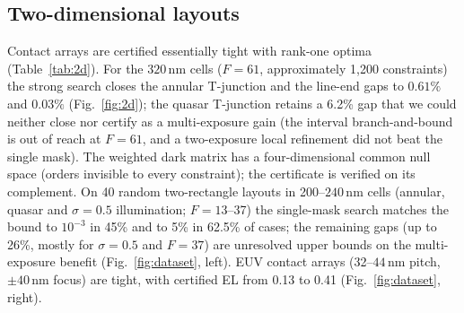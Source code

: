 \documentclass[11pt,a4paper]{article}
\newcommand{\SI}[2]{\ensuremath{#1\,\mathrm{#2}}}\newcommand{\SIrange}[3]{\ensuremath{#1\text{--}#2\,\mathrm{#3}}}
\begin{document}
\subsection{Two-dimensional layouts}
Contact arrays are certified essentially tight with rank-one optima (Table~\ref{tab:2d}). For the \SI{320}{nm} cells ($F=61$, approximately 1,200 constraints) the strong search closes the annular T-junction and the line-end gaps to $0.61\%$ and $0.03\%$ (Fig.~\ref{fig:2d}); the quasar T-junction retains a 6.2\% gap that we could neither close nor certify as a multi-exposure gain (the interval branch-and-bound is out of reach at $F=61$, and a two-exposure local refinement did not beat the single mask). The weighted dark matrix has a four-dimensional common null space (orders invisible to every constraint); the certificate is verified on its complement. On 40 random two-rectangle layouts in 200--\SI{240}{nm} cells (annular, quasar and $\sigma=0.5$ illumination; $F=13$--37) the single-mask search matches the bound to $10^{-3}$ in 45\% and to 5\% in 62.5\% of cases; the remaining gaps (up to 26\%, mostly for $\sigma=0.5$ and $F=37$) are unresolved upper bounds on the multi-exposure benefit (Fig.~\ref{fig:dataset}, left). EUV contact arrays (32--\SI{44}{nm} pitch, $\pm\SI{40}{nm}$ focus) are tight, with certified EL from 0.13 to 0.41 (Fig.~\ref{fig:dataset}, right).
\end{document}
